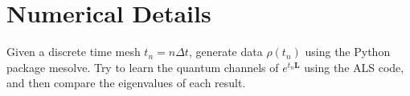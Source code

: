 \documentclass[10pt]{article}  %
\theoremstyle{plain}
\numberwithin{equation}{section}
\newcommand{\bL}{\mathbf{L}}
\begin{document}
\section{Numerical Details}

Given a discrete time mesh $t_n = n \Delta t$, generate data $\rho(t_n)$ using the Python package mesolve. Try to learn the quantum channels of $e^{t_n\bL}$ using the ALS code, and then compare the eigenvalues of each result.






























\printbibliography
\end{document}
